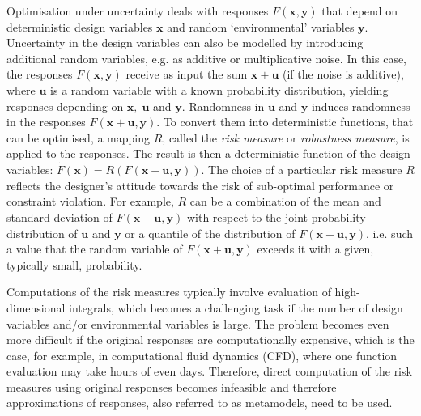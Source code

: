 \documentclass[10pt,twocolumn,a4paper]{article}
\begin{document}
Optimisation under uncertainty deals with responses $F(\pmb x,\pmb y)$ that depend on deterministic design variables $\pmb x$ and random ‘environmental’ variables $\pmb y$. Uncertainty in the design variables can also be modelled by introducing additional random variables, e.g. as additive or multiplicative noise. In this case, the responses $F(\pmb x,\pmb y)$ receive as input the sum $\pmb x+\pmb u$ (if the noise is additive), where $\pmb u$ is a random variable with a known probability distribution, yielding responses depending on $\pmb x,\; \pmb u$ and $\pmb y$. Randomness in $\pmb u$ and $\pmb y$ induces randomness in the responses $F(\pmb x+\pmb u,\pmb y)$. To convert them into deterministic functions, that can be optimised, a mapping $R$, called the \textit{risk measure}\cite{RockafellarUryasev2000} or \textit{robustness measure}\cite{SchillingsSchulz2015}, is applied to the responses. The result is then a deterministic function of the design variables: $\widetilde{F}(\pmb x)=R(F(\pmb x+\pmb u, \pmb y))$. The choice of a particular risk measure $R$ reflects the designer's attitude towards the risk of sub-optimal performance or constraint violation. For example, $R$ can be a combination of the mean and standard deviation of $F(\pmb x+ \pmb u,\pmb y)$ with respect to the joint probability distribution of $\pmb u$ and $\pmb y$ or a quantile of the distribution of $F(\pmb x+ \pmb u,\pmb y)$, i.e. such a value that the random variable of $F(\pmb x+\pmb u,\pmb y)$ exceeds it with a given, typically small, probability.

Computations of the risk measures typically involve evaluation of high-dimensional integrals, which becomes a challenging task if the number of design variables and/or environmental variables is large. The problem becomes even more difficult if the original responses are computationally expensive, which is the case, for example, in computational fluid dynamics (CFD), where one function evaluation may take hours of even days. Therefore, direct computation of the risk measures using original responses becomes infeasible and therefore approximations of responses, also referred to as metamodels, need to be used.
\end{document}
